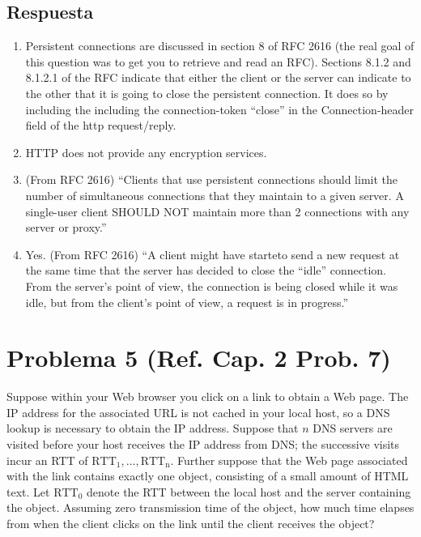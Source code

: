 \documentclass[10pt,spanish]{article}
\numberwithin{figure}{section} %
\begin{document}
\subsection*{Respuesta}

\begin{enumerate}
\item Persistent connections are discussed in section 8 of RFC 2616 (the real goal of this question was to get you to retrieve and read an RFC). Sections 8.1.2 and 8.1.2.1 of the RFC indicate that either the client or the server can indicate to the other that it is going to close the persistent connection. It does so by including the including the connection-token ``close'' in the Connection-header field of the http request/reply.
\item HTTP does not provide any encryption services.
\item (From RFC 2616) ``Clients that use persistent connections should limit the
number of simultaneous connections that they maintain to a given server. A single-user client SHOULD NOT maintain more than 2 connections with any server or proxy.''
\item Yes. (From RFC 2616) ``A client might have starteto send a new request at the same time that the server has decided to close the ``idle'' connection. From the server's point of view, the connection is being closed while it was idle, but from the client's point of view, a request is in progress.''
\end{enumerate}

\section[Problema 5]{Problema 5 \textnormal{\Large{(Ref. Cap. 2 Prob. 7)}}}

Suppose within your Web browser you click on a link to obtain a Web page. The IP address for the associated URL is not cached in your local host, so a DNS lookup is necessary to obtain the IP address. Suppose that $n$ DNS servers are visited before your host receives the IP address from DNS; the successive visits incur an RTT of $\mathrm{RTT_1 , \ldots , RTT_n}$. Further suppose that the Web page associated with the link contains exactly one object, consisting of a small amount of HTML text. Let $\mathrm{RTT_0}$ denote the RTT between the local host and the server containing the object. Assuming zero transmission time of the object, how much time elapses from when the client clicks on the link until the client receives the object?
\end{document}

